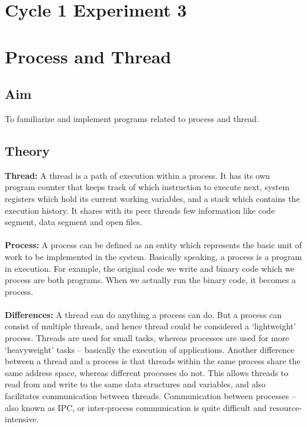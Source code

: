 \section*{Cycle 1 Experiment 3}

\section{\Large{Process and Thread}}

\subsection{Aim}
\large To familiarize and implement programs related to process and thread.

\subsection{Theory}
\textbf{Thread: }
A thread is a path of execution within a process. It has its own program counter that keeps track of which instruction to execute next, system registers which hold its current working variables, and a stack which contains the execution history. It shares with its peer threads few information like code segment, data segment and open files.
\\
\\
\textbf{Process: }
A process can be defined as an entity which represents the basic unit of work to be implemented in the system. Basically speaking, a process is a program in execution. For example, the original code we write and binary code which we process are both programs. When we actually run the binary code, it becomes a process.
\\
\\
\textbf{Differences: }
A thread can do anything a process can do. But a process can consist of multiple threads, and hence thread could be considered a ‘lightweight’ process. Threads are used for small tasks, whereas processes are used for more ‘heavyweight’ tasks – basically the execution of applications. Another difference between a thread and a process is that threads within the same process share the same address space, whereas different processes do not. This allows threads to read from and write to the same data structures and variables, and also facilitates communication between threads. Communication between processes – also known as IPC, or inter-process communication is quite difficult and resource-intensive.

